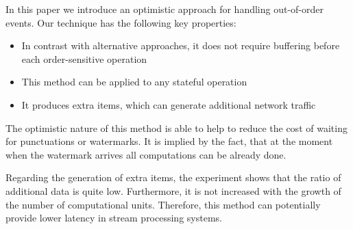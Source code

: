 
\label {fs-conclusion}

In this paper we introduce an optimistic approach for handling out-of-order events. Our technique has the following key properties:

\begin{itemize}
    \item In contrast with  alternative  approaches, it does not require buffering before each order-sensitive operation
    \item This method can be applied to any stateful operation
    \item It produces extra items, which can generate additional network traffic
\end{itemize}

The optimistic nature of this method is able to help to reduce the cost of waiting for punctuations or watermarks. It is implied by the fact, that at the moment when the watermark arrives all computations can be already done. 

Regarding the generation of extra items, the experiment shows that the ratio of additional data is quite low. Furthermore, it is not increased with the growth of the number of computational units. Therefore, this method can potentially provide lower latency in stream processing systems.